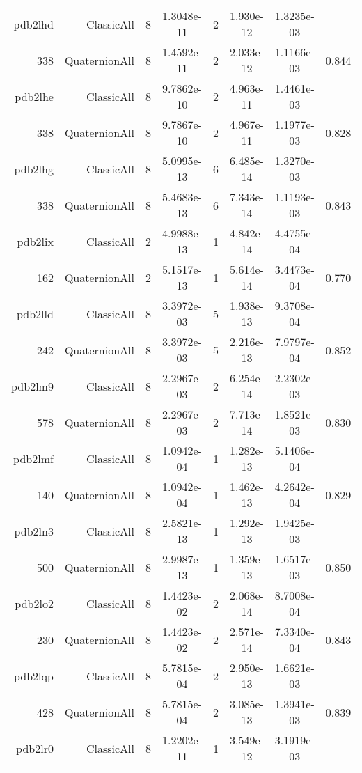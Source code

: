 \begin{xltabular}{\textwidth}{r|rcS[table-format=1.4e+2]cS[table-format=1.3e+2]S[table-format=1.4e+2]S[table-format=-1.3]}
pdb2lhd & ClassicAll & 8 & 1.3048e-11 & 2 & 1.930e-12 & 1.3235e-03 & \\
338 & QuaternionAll & 8 & 1.4592e-11 & 2 & 2.033e-12 & 1.1166e-03 & 0.844\\  \addlinespace
pdb2lhe & ClassicAll & 8 & 9.7862e-10 & 2 & 4.963e-11 & 1.4461e-03 & \\
338 & QuaternionAll & 8 & 9.7867e-10 & 2 & 4.967e-11 & 1.1977e-03 & 0.828\\  \addlinespace
pdb2lhg & ClassicAll & 8 & 5.0995e-13 & 6 & 6.485e-14 & 1.3270e-03 & \\
338 & QuaternionAll & 8 & 5.4683e-13 & 6 & 7.343e-14 & 1.1193e-03 & 0.843\\  \addlinespace
pdb2lix & ClassicAll & 2 & 4.9988e-13 & 1 & 4.842e-14 & 4.4755e-04 & \\
162 & QuaternionAll & 2 & 5.1517e-13 & 1 & 5.614e-14 & 3.4473e-04 & 0.770\\  \addlinespace
pdb2lld & ClassicAll & 8 & 3.3972e-03 & 5 & 1.938e-13 & 9.3708e-04 & \\
242 & QuaternionAll & 8 & 3.3972e-03 & 5 & 2.216e-13 & 7.9797e-04 & 0.852\\  \addlinespace
pdb2lm9 & ClassicAll & 8 & 2.2967e-03 & 2 & 6.254e-14 & 2.2302e-03 & \\
578 & QuaternionAll & 8 & 2.2967e-03 & 2 & 7.713e-14 & 1.8521e-03 & 0.830\\  \addlinespace
pdb2lmf & ClassicAll & 8 & 1.0942e-04 & 1 & 1.282e-13 & 5.1406e-04 & \\
140 & QuaternionAll & 8 & 1.0942e-04 & 1 & 1.462e-13 & 4.2642e-04 & 0.829\\  \addlinespace
pdb2ln3 & ClassicAll & 8 & 2.5821e-13 & 1 & 1.292e-13 & 1.9425e-03 & \\
500 & QuaternionAll & 8 & 2.9987e-13 & 1 & 1.359e-13 & 1.6517e-03 & 0.850\\  \addlinespace
pdb2lo2 & ClassicAll & 8 & 1.4423e-02 & 2 & 2.068e-14 & 8.7008e-04 & \\
230 & QuaternionAll & 8 & 1.4423e-02 & 2 & 2.571e-14 & 7.3340e-04 & 0.843\\  \addlinespace
pdb2lqp & ClassicAll & 8 & 5.7815e-04 & 2 & 2.950e-13 & 1.6621e-03 & \\
428 & QuaternionAll & 8 & 5.7815e-04 & 2 & 3.085e-13 & 1.3941e-03 & 0.839\\  \addlinespace
pdb2lr0 & ClassicAll & 8 & 1.2202e-11 & 1 & 3.549e-12 & 3.1919e-03 & \\

\end{xltabular}
